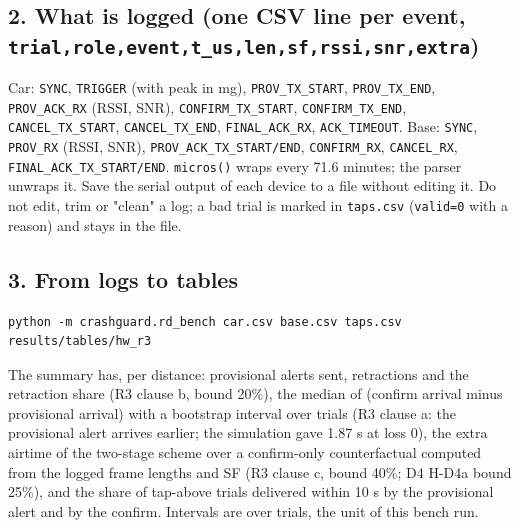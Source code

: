 \subsection*{2. What is logged (one CSV line per event, \texttt{trial,role,event,t\_us,len,sf,rssi,snr,extra})}
Car: \texttt{SYNC}, \texttt{TRIGGER} (with peak in mg), \texttt{PROV\_TX\_START}, \texttt{PROV\_TX\_END}, \texttt{PROV\_ACK\_RX} (RSSI, SNR), \texttt{CONFIRM\_TX\_START}, \texttt{CONFIRM\_TX\_END}, \texttt{CANCEL\_TX\_START}, \texttt{CANCEL\_TX\_END}, \texttt{FINAL\_ACK\_RX}, \texttt{ACK\_TIMEOUT}.
Base: \texttt{SYNC}, \texttt{PROV\_RX} (RSSI, SNR), \texttt{PROV\_ACK\_TX\_START/END}, \texttt{CONFIRM\_RX}, \texttt{CANCEL\_RX}, \texttt{FINAL\_ACK\_TX\_START/END}.
\texttt{micros()} wraps every 71.6 minutes; the parser unwraps it. Save the serial output of each device to a file without editing it. Do not edit, trim or "clean" a log; a bad trial is marked in \texttt{taps.csv} (\texttt{valid=0} with a reason) and stays in the file.

\subsection*{3. From logs to tables}
\begin{verbatim}
python -m crashguard.rd_bench car.csv base.csv taps.csv results/tables/hw_r3
\end{verbatim}
The summary has, per distance: provisional alerts sent, retractions and the retraction share (R3 clause b, bound 20\%), the median of (confirm arrival minus provisional arrival) with a bootstrap interval over trials (R3 clause a: the provisional alert arrives earlier; the simulation gave 1.87 s at loss 0), the extra airtime of the two-stage scheme over a confirm-only counterfactual computed from the logged frame lengths and SF (R3 clause c, bound 40\%; D4 H-D4a bound 25\%), and the share of tap-above trials delivered within 10 s by the provisional alert and by the confirm. Intervals are over trials, the unit of this bench run.

